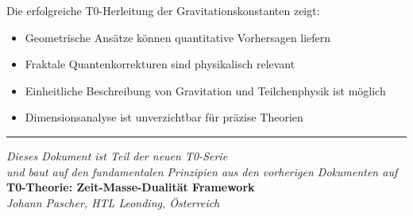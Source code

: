 \documentclass[12pt,a4paper]{article}
\begin{document}
	Die erfolgreiche T0-Herleitung der Gravitationskonstanten zeigt:
	\begin{itemize}
		\item Geometrische Ansätze können quantitative Vorhersagen liefern
		\item Fraktale Quantenkorrekturen sind physikalisch relevant
		\item Einheitliche Beschreibung von Gravitation und Teilchenphysik ist möglich
		\item Dimensionsanalyse ist unverzichtbar für präzise Theorien
	\end{itemize}
	
	\begin{center}
		\hrule
		\vspace{0.5cm}
		\textit{Dieses Dokument ist Teil der neuen T0-Serie}\\
		\textit{und baut auf den fundamentalen Prinzipien aus den vorherigen Dokumenten auf}\\
		\vspace{0.3cm}
		\textbf{T0-Theorie: Zeit-Masse-Dualität Framework}\\
		\textit{Johann Pascher, HTL Leonding, Österreich}\\
	\end{center}
	
\end{document}
